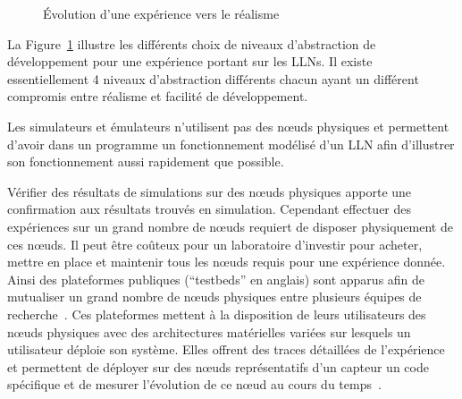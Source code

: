 \begin{figure}[ht]
\caption{Évolution d'une expérience vers le réalisme}
\label{makesense:fig:workflow}
\end{figure}

La Figure~\ref{makesense:fig:workflow} illustre les différents choix de niveaux d'abstraction de développement pour une expérience portant sur les \ac{LLN}s.
Il existe essentiellement 4 niveaux d'abstraction différents chacun ayant un différent compromis entre réalisme et facilité de développement.

Les simulateurs et émulateurs n'utilisent pas des nœuds physiques et permettent d'avoir dans un programme un fonctionnement modélisé d'un \ac{LLN} afin d'illustrer son fonctionnement aussi rapidement que possible.

Vérifier des résultats de simulations sur des nœuds physiques apporte une confirmation aux résultats trouvés en simulation.
Cependant effectuer des expériences sur un grand nombre de nœuds requiert de disposer physiquement de ces nœuds.
Il peut être coûteux pour un laboratoire d'investir pour acheter, mettre en place et maintenir tous les nœuds requis pour une expérience donnée.
Ainsi des plateformes publiques (``testbeds'' en anglais) sont apparus afin de mutualiser un grand nombre de nœuds physiques entre plusieurs équipes de recherche~\cite{doddavenkatappa2012indriya, fleury2015fit}.
Ces plateformes mettent à la disposition de leurs utilisateurs des nœuds physiques avec des architectures matérielles variées sur lesquels un utilisateur déploie son système.
Elles offrent des traces détaillées de l'expérience et permettent de déployer sur des nœuds représentatifs d'un capteur un code spécifique et de mesurer l'évolution de ce nœud au cours du temps~\cite{fleury2015fit}.

